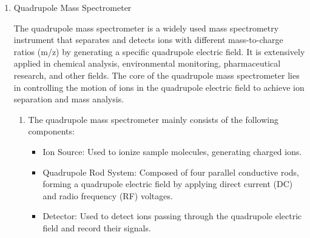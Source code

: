 \begin{enumerate}
\begin{itemize}
\begin{enumerate}
			By detecting the characteristic spectral lines of specific elements or compounds, the chemical composition of the plasma can be determined. By analyzing the width, intensity, and shift of spectral lines, the electron temperature and ion temperature of the plasma can be inferred. For example, the broadening of spectral lines can reflect the thermal motion of electrons or ions, which corresponds to the electron temperature or ion temperature. Electron temperature is usually determined by analyzing the continuous spectrum (such as bremsstrahlung) or the intensity distribution of emission lines. By analyzing the intensity distribution of spectral lines and the relative intensity between lines, the electron density and ion density in the plasma can be estimated. For example, the broadening of spectral lines due to the Stark effect is proportional to the electron density, thus it can be used to measure electron density. The broadening of spectral lines due to the Doppler effect can be used to analyze the velocity distribution of particles in the plasma, thereby studying the kinetic properties of the plasma. For example, in plasmas under strong magnetic fields, the Doppler effect can reveal the motion of particles in the direction of the magnetic field.
		\end{enumerate}
	\end{itemize}
				
	\item Quadrupole Mass Spectrometer
	
	The quadrupole mass spectrometer is a widely used mass spectrometry instrument that separates and detects ions with different mass-to-charge ratios (m/z) by generating a specific quadrupole electric field. It is extensively applied in chemical analysis, environmental monitoring, pharmaceutical research, and other fields. The core of the quadrupole mass spectrometer lies in controlling the motion of ions in the quadrupole electric field to achieve ion separation and mass analysis.
	
	\begin{enumerate}
		\item The quadrupole mass spectrometer mainly consists of the following components:
		
		\begin{itemize}
			\item Ion Source: Used to ionize sample molecules, generating charged ions.
			\item Quadrupole Rod System: Composed of four parallel conductive rods, forming a quadrupole electric field by applying direct current (DC) and radio frequency (RF) voltages.
			\item Detector: Used to detect ions passing through the quadrupole electric field and record their signals.
		\end{itemize}
		

\end{enumerate}
\end{enumerate}

